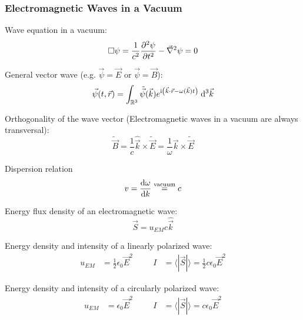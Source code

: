 		\subsubsection{Electromagnetic Waves in a Vacuum}
			\noindent
			Wave equation in a vacuum:
			\begin{equation}
				\Box\psi = \frac{1}{c^2} \frac{\partial^2 \psi}{\partial t^2} - \vec{\nabla}^2 \psi = 0
			\end{equation}

			\noindent
			General vector wave (e.g. $\vec{\psi}=\vec{E}$ or $ \vec{\psi}=\vec{B}$):
			\begin{equation}
				\vec{\psi}(t,\vec{r}) = \int_{\mathbb{R}^3} \tilde{\vec{\psi}} (\vec{k}) e^{\mathrm{i}\left(\vec{k}\cdot\vec{r} - \omega(\vec{k})t \right)}\; \dd^3\vec{k}
			\end{equation}

			\noindent
			Orthogonality of the wave vector (Electromagnetic waves in a vacuum are always transversal):
			\begin{equation}
				\tilde{\vec{B}} = \frac{1}{c}\hat{\vec{k}}\times\tilde{\vec{E}} = \frac{1}{\omega}\vec{k}\times\tilde{\vec{E}}
			\end{equation}

			\noindent
			Dispersion relation
			\begin{equation}
				v = \dv{\omega}{k} \stackrel{\text{vacuum}}{=} c
			\end{equation}

			\noindent
			Energy flux density of an electromagnetic wave:
			\begin{equation}
				\vec{S} = u_{EM}c\hat{\vec{k}}
			\end{equation}

			\noindent
			Energy density and intensity of a linearly polarized wave:
			\begin{equation}
				\begin{aligned}
					u_{EM} &= \frac{1}{2}\epsilon_0\vec{E}^2 &\hspace{20pt}
					I &= \langle|\vec{S}|\rangle = \frac{1}{2}c\epsilon_0\vec{E}^2
				\end{aligned}
			\end{equation}

			\noindent
			Energy density and intensity of a circularly polarized wave:
			\begin{equation}
				\begin{aligned}
					u_{EM} &= \epsilon_0\vec{E}^2 &\hspace{20pt}
					I &= \langle|\vec{S}|\rangle = c\epsilon_0\vec{E}^2
				\end{aligned}
			\end{equation}

